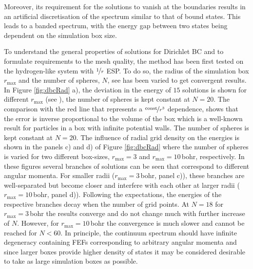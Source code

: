 Moreover, its requirement for the solutions to vanish at the boundaries results in an artificial discretisation of the spectrum similar to that of bound states.
This leads to a banded spectrum, with the energy gap between two states being dependent on the simulation box size.

To understand the general properties of solutions for Dirichlet BC and to formulate requirements to the mesh quality, the method has been first tested on the hydrogen-like system with $\nicefrac{1}{r}$ ESP.
To do so, the radius of the simulation box $r_\text{max}$ and the number of spheres, $N$, see  has been varied to get convergent results.
In Figure \ref{fig:dbcRad} a), the deviation in the energy of $15$ solutions is shown for different $r_\text{max}$ (see ), the number of spheres is kept constant at $N=20$.
The comparison with the red line that represents a $\nicefrac{\text{const}}{r^3}$ dependence, shows that the error is inverse proportional to the volume of the box which is a well-known result for particles in a box with infinite potential walls. 
The number of spheres is kept constant at $N=20$.
The influence of radial grid density on the energies is shown in the panels c) and d) of Figure \ref{fig:dbcRad} where the number of spheres is varied for two different box-sizes, $r_\text{max}=3$ and $r_\text{max}=10\,$bohr, respectively.
In these figures several branches of solutions can be seen that correspond to different angular momenta.
For smaller radii ($r_\text{max}=3\,$bohr, panel c)), these branches are well-separated but become closer and interfere with each other at larger radii ($r_\text{max}=10\,$bohr, panel d)).
Following the expectations, the energies of the respective branches decay when the number of grid points.
At $N=18$ for $r_\text{max}=3\,$bohr the results converge and do not change much with further increase of $N$.
However, for $r_\text{max}=10\,$bohr the convergence is much slower and cannot be reached for $N<60$.
In principle, the continuum spectrum should have infinite degeneracy containing FEFs corresponding to arbitrary angular momenta and since larger boxes provide higher density of states it may be considered desirable to take as large simulation boxes as possible.
